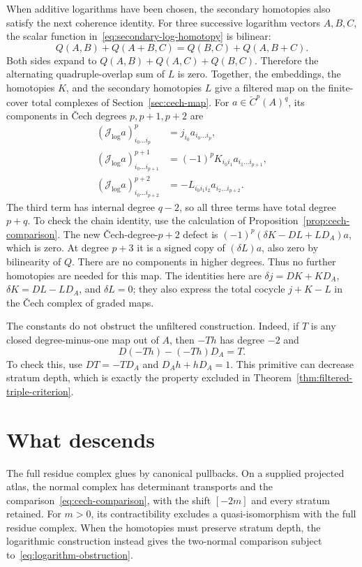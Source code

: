 When additive logarithms have been chosen, the secondary homotopies also satisfy the next coherence identity.
For three successive logarithm vectors $A,B,C$, the scalar function in~\eqref{eq:secondary-log-homotopy} is bilinear:
\[
Q(A,B)+Q(A+B,C)=Q(B,C)+Q(A,B+C).
\]
Both sides expand to $Q(A,B)+Q(A,C)+Q(B,C)$.
Therefore the alternating quadruple-overlap sum of $L$ is zero.
Together, the embeddings, the homotopies $K$, and the secondary homotopies $L$
give a filtered map on the finite-cover total complexes of Section~\ref{sec:cech-map}.
For $a\in\check C^p(A)^q$, its components in \v Cech degrees $p,p+1,p+2$ are
\begin{align*}
(\mathcal J_{\log}a)^p_{i_0\ldots i_p}
&=j_{i_0}a_{i_0\ldots i_p},\\
(\mathcal J_{\log}a)^{p+1}_{i_0\ldots i_{p+1}}
&=(-1)^pK_{i_0i_1}a_{i_1\ldots i_{p+1}},\\
(\mathcal J_{\log}a)^{p+2}_{i_0\ldots i_{p+2}}
&=-L_{i_0i_1i_2}a_{i_2\ldots i_{p+2}}.
\end{align*}
The third term has internal degree $q-2$, so all three terms have total degree $p+q$.
To check the chain identity, use the calculation of Proposition~\ref{prop:cech-comparison}.
The new \v Cech-degree-$p+2$ defect is
$(-1)^p(\delta K-DL+LD_A)a$, which is zero.
At degree $p+3$ it is a signed copy of $(\delta L)a$, also zero by bilinearity of $Q$.
There are no components in higher degrees.
Thus no further homotopies are needed for this map.
The identities here are $\delta j=DK+KD_A$, $\delta K=DL-LD_A$, and $\delta L=0$;
they also express the total cocycle $j+K-L$ in the \v Cech complex of graded maps.

The constants do not obstruct the unfiltered construction.
Indeed, if $T$ is any closed degree-minus-one map out of $A$, then $-Th$ has degree $-2$ and
\[
D(-Th)-(-Th)D_A=T.
\]
To check this, use $DT=-TD_A$ and $D_Ah+hD_A=1$.
This primitive can decrease stratum depth, which is exactly the property excluded in Theorem~\ref{thm:filtered-triple-criterion}.

\section{What descends}
\label{sec:consumer-map}

The full residue complex glues by canonical pullbacks.
On a supplied projected atlas, the normal complex has determinant transports and the comparison~\eqref{eq:cech-comparison},
with the shift $[-2m]$ and every stratum retained.
For $m>0$, its contractibility excludes a quasi-isomorphism with the full residue complex.
When the homotopies must preserve stratum depth, the logarithmic construction instead gives the two-normal comparison
subject to~\eqref{eq:logarithm-obstruction}.

